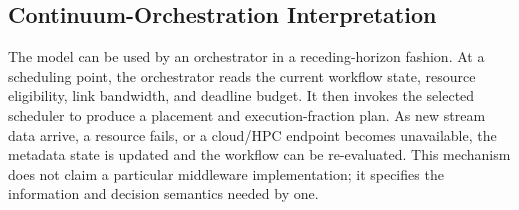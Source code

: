 \subsection{Continuum-Orchestration Interpretation}

The model can be used by an orchestrator in a receding-horizon fashion. At a scheduling point, the orchestrator reads the current workflow state, resource eligibility, link bandwidth, and deadline budget. It then invokes the selected scheduler to produce a placement and execution-fraction plan. As new stream data arrive, a resource fails, or a cloud/HPC endpoint becomes unavailable, the metadata state is updated and the workflow can be re-evaluated. This mechanism does not claim a particular middleware implementation; it specifies the information and decision semantics needed by one.
